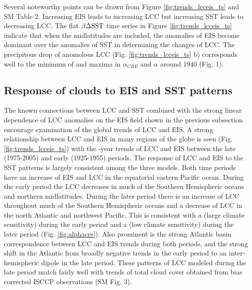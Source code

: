 Several noteworthy points can be drawn from Figure \ref{fig:trends_lcceis_ts} and SM Table 2.  Increasing EIS leads to increasing LCC but increasing SST leads to decreasing LCC.  
     The  flat $\beta \Delta \rm{SST}$ time series in Figure \ref{fig:trends_lcceis_ts} indicate that when the midlatitudes are included,  the anomalies of EIS become dominant over the anomalies of SST in determining the changes of LCC.   The precipitous drop of anomolous LCC (Fig. \ref{fig:trends_lcceis_ts} b) corresponds well to the minimum of  and maxima in $\alpha_{CRE}$ and $\alpha$ around 1940 (Fig. 1).  

\subsection{Response of clouds to EIS and SST patterns}

The known connections between LCC and SST \citep{Qu_etal_2014, Zhou_etal_2016, Myers_Norris_2016} combined with the strong linear dependence of LCC anomalies on the EIS field shown in the previous subsection encourage examination of the global trends of LCC and EIS.   
A strong relationship between LCC and EIS in many regions of the globe is seen (Fig. \ref{fig:trends_lcceis_ts}) with the -year trends of LCC and EIS between the late (1975-2005) and early (1925-1955) periods. 
The response of LCC and EIS to the SST patterns is largely consistent among the three models.   Both time periods have an increase of EIS and LCC in the equatorial eastern Pacific ocean.   During the early period the LCC decreases in much of the Southern Hemispheric oceans and northern midlatitudes.
During the later period there is an increase of LCC throughout much of the Southern Hemispheric oceans and a decrease of LCC in the north Atlantic and northwest Pacific.    This is consistent with a  (large climate sensitivity) during the early period and a  (low climate sensitivity) during the later period (Fig. \ref{fig:alphacre}).  Also prominent is the strong Atlantic basin correspondence between LCC and EIS trends during both periods, and the strong shift in the Atlantic from broadly negative trends in the early period to an inter-hemispheric dipole in the late period.  These patterns of LCC modeled during the late period match fairly well with trends of total cloud cover obtained from bias corrected ISCCP observations (SM Fig. 3).  
 
